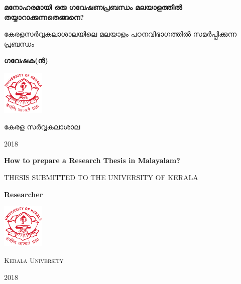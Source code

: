 \begin{titlepage}
	\centering
	{\huge\bfseries  മനോഹരമായി ഒരു ഗവേഷണപ്രബന്ധം  മലയാളത്തിൽ തയ്യാറാക്കുന്നതെങ്ങനെ? \par}
	
	\vspace{1cm}
	{\scshape\Large കേരളസർവ്വകലാശാലയിലെ മലയാളം പഠനവിഭാഗത്തിൽ സമർപ്പിക്കുന്ന പ്രബന്ധം \par}
	
		
	\vspace{2cm}
	{\Large\bfseries ഗവേഷക(ൻ) \par}
	\vfill
	\includegraphics[width=0.15\textwidth]{./contents/logo}\par\vspace{1cm}
	{\scshape\LARGE കേരള സർവ്വകലാശാല \par}

	{\large 2018 \par}
\end{titlepage}
 
\begin{titlepage}

	{\gentium
	\centering
	{\huge\bfseries  How to prepare a Research Thesis in Malayalam? \par}
	
	\vspace{1cm}
	{\scshape\Large THESIS SUBMITTED TO THE UNIVERSITY OF KERALA \par}
	
		
	\vspace{2cm}
	{\Large\bfseries Researcher \par}
	\vfill
	\includegraphics[width=0.15\textwidth]{./contents/logo}\par\vspace{1cm}
	{\scshape\LARGE Kerala University \par}
	
	{\large 2018 \par}
	}
\end{titlepage}